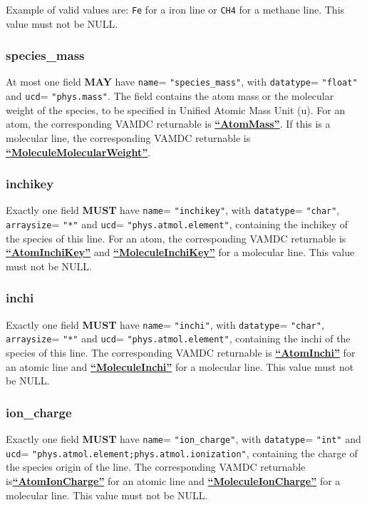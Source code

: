 \documentclass[11pt,a4paper]{ivoa}
\def\attrval#1#2{\texttt{#1}\discretionary{}{}{}=\discretionary{}{}{}%
  \texttt{"#2"}}
\def\vamdcret#1{\href{https://dictionary.vamdc.eu/returnables/\##1}{\textbf{``\color{vamdccolor}#1''}}}
\begin{document}
Example of valid values are: \texttt{Fe} for a iron line or \texttt{CH4} for a methane line.
This value must not be NULL.

\subsubsection{species\_mass}

At most one field \textbf{MAY} have \attrval{name}{species\_mass}, with  \attrval{datatype}{float} and \attrval{ucd}{phys.mass}.
The field contains the atom mass or the molecular weight of the species, to be specified in Unified Atomic Mass Unit (u).
For an atom, the corresponding VAMDC returnable is \vamdcret{AtomMass}.
If this is a molecular line, the corresponding VAMDC returnable is \vamdcret{MoleculeMolecularWeight}.

\subsubsection{inchikey}

Exactly one field \textbf{MUST} have \attrval{name}{inchikey}, with \attrval{datatype}{char}, \attrval{arraysize}{*} and
\attrval{ucd}{phys.atmol.element}, containing the inchikey \citep{Heller2015} of
the species of this line. For an atom, the corresponding VAMDC returnable is \vamdcret{AtomInchiKey}
and \vamdcret{MoleculeInchiKey} for a molecular line.
This value must not be NULL.

\subsubsection{inchi}

Exactly one field \textbf{MUST} have \attrval{name}{inchi}, with
\attrval{datatype}{char}, \attrval{arraysize}{*} and
\attrval{ucd}{phys.atmol.element}, containing the inchi of the
species of this line. The corresponding VAMDC returnable is \vamdcret{AtomInchi}
for an atomic line and \vamdcret{MoleculeInchi} for a molecular line.
This value must not be NULL.

\subsubsection{ion\_charge}

Exactly one field \textbf{MUST} have \attrval{name}{ion\_charge}, with
\attrval{datatype}{int} and \attrval{ucd}{phys.atmol.element;phys.atmol.ionization}, containing the charge of the species origin of the line.
The corresponding VAMDC returnable is\vamdcret{AtomIonCharge}
for an atomic line and \vamdcret{MoleculeIonCharge} for a molecular line. This value must not be NULL.
\end{document}
